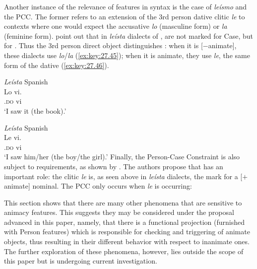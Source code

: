 \documentclass[output=paper]{langsci/langscibook}
\begin{document}
Another instance of the relevance of  features in syntax is the case of
\emph{leísmo} and the \gls{PCC}. The former refers to an extension of the 3rd
person dative clitic \emph{le} to contexts where one would expect the
accusative  \emph{lo} (masculine form) or \emph{la} (feminine form).
\citet[319--320]{OrmazabalRomero2013} point out that in \emph{leísta} dialects
of ,  are not marked for Case, but for . Thus the 3rd
person direct object distinguishes : when it is [$-$animate], these
dialects use \emph{lo}/\emph{la} (\ref{ex:key:27.45}); when it is animate, they
use \emph{le}, the same form of the dative (\ref{ex:key:27.46}).

\ea\label{ex:key:27.45} \emph{Leísta} Spanish\\
    \gll    Lo vi.\\
            \Tsg{}.\textsc{do} vi\\
    \glt    `I saw it (the book).'
\z

\ea\label{ex:key:27.46} \emph{Leísta} Spanish\\
    \gll    Le vi.\\
            \Tsg{}.\textsc{do}   vi\\
    \glt    `I saw him/her (the boy/the girl).'
\z
Finally, the Person-Case Constraint is also subject to  requirements, as
shown by \citet{OrmazabalRomero2007,OrmazabalRomero2013}. The authors propose that  has
an important role: the clitic \emph{le} is, as seen above in \emph{leísta}
dialects, the mark for a [$+$animate] nominal. The \gls{PCC} only occurs when
\emph{le} is occurring:

\ea\label{ex:key:27.47} 
    \z
\z
This section shows that there are many other phenomena that are sensitive to
animacy features. This suggests they may be considered under the proposal
advanced in this paper, namely, that there is a functional projection
(furnished with Person features) which is responsible for checking and
triggering  of animate objects, thus resulting in their different
behavior with respect to inanimate ones. The further exploration of these
phenomena, however, lies outside the scope of this paper but is undergoing
current investigation.
\end{document}
